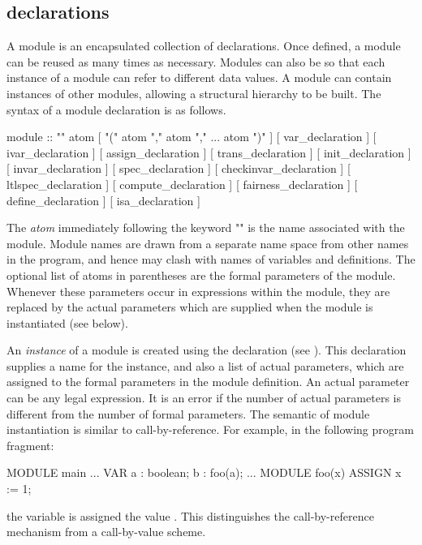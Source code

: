 \subsection { declarations}
\label{MODULE declarations}
A module is an encapsulated collection of declarations. Once defined,
a module can be reused as many times as necessary. Modules can also be
so that each instance of a module can refer to different data
values. A module can contain instances of other modules, allowing a
structural hierarchy to be built. The syntax of a module declaration
is as follows.
%
\begin{Grammar}
module :: "" atom [ "(" atom "," atom "," ... atom ")" ]
          [ var_declaration        ]
          [ ivar_declaration       ]
          [ assign_declaration     ]
          [ trans_declaration      ]
          [ init_declaration       ]
          [ invar_declaration      ]
          [ spec_declaration       ]
          [ checkinvar_declaration ]
          [ ltlspec_declaration    ]
          [ compute_declaration    ]
          [ fairness_declaration   ]
          [ define_declaration     ]
          [ isa_declaration        ]
\end{Grammar}
%
The \emph{atom} immediately following the keyword "" is
the name associated with the module. Module names are drawn from a
separate name space from other names in the program, and hence may
clash with names of variables and definitions. The optional list of
atoms in parentheses are the formal parameters of the module. Whenever
these parameters occur in expressions within the module, they are
replaced by the actual parameters which are supplied when the module
is instantiated (see below).

An \emph{instance} of a module is created using the 
declaration (see ). This declaration supplies a
name for the instance, and also a list of actual parameters, which are
assigned to the formal parameters in the module definition. An actual
parameter can be any legal expression. It is an error if the number of
actual parameters is different from the number of formal
parameters. The semantic of module instantiation is similar to
call-by-reference. For example, in the following program fragment:
%
\begin{nusmvCode}
MODULE main
...
 VAR
  a : boolean;
  b : foo(a);
...
MODULE foo(x)
 ASSIGN
   x := 1;
\end{nusmvCode}
%
the variable  is assigned the value . This
distinguishes the call-by-reference mechanism from a call-by-value
scheme.

